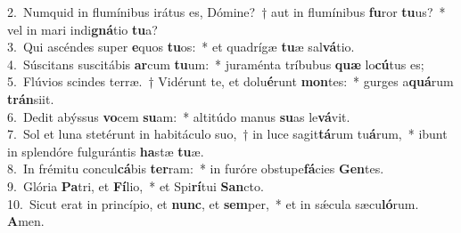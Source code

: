 {2.~}Numquid in flumínibus irátus es, Dómine?~† aut in flumínibus \textbf{fu}ror \textbf{tu}us?~* vel in mari indi\textbf{gná}tio \textbf{tu}a?\\
{3.~}Qui ascéndes super \textbf{e}quos \textbf{tu}os:~* et quadrígæ \textbf{tu}æ sal\textbf{vá}tio.\\
{4.~}Súscitans suscitábis \textbf{ar}cum \textbf{tu}um:~* juraménta tríbubus \textbf{quæ} lo\textbf{cú}tus es;\\
{5.~}Flúvios scindes terræ.~† Vidérunt te, et dolu\textbf{é}runt \textbf{mon}tes:~* gurges a\textbf{quá}rum \textbf{trán}siit.\\
{6.~}Dedit abýssus \textbf{vo}cem \textbf{su}am:~* altitúdo manus \textbf{su}as le\textbf{vá}vit.\\
{7.~}Sol et luna stetérunt in habitáculo suo,~† in luce sagit\textbf{tá}rum tu\textbf{á}rum,~* ibunt in splendóre fulgurántis \textbf{ha}stæ \textbf{tu}æ.\\
{8.~}In frémitu concul\textbf{cá}bis \textbf{ter}ram:~* in furóre obstupe\textbf{fá}cies \textbf{Gen}tes.\\
{9.~}Glória \textbf{Pa}tri, et \textbf{Fí}lio,~* et Spi\textbf{rí}tui \textbf{San}cto.\\
{10.~}Sicut erat in princípio, et \textbf{nunc}, et \textbf{sem}per,~* et in sǽcula sæcu\textbf{ló}rum. \textbf{A}men.\\
